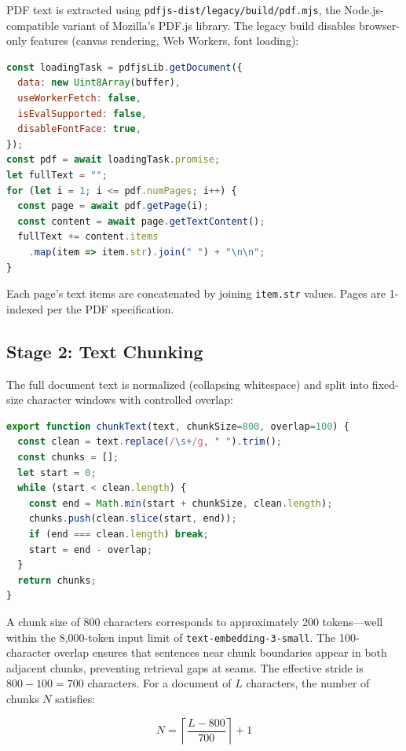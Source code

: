 \documentclass[conference]{IEEEtran}
\begin{document}
PDF text is extracted using \texttt{pdfjs-dist/legacy/build/pdf.mjs}, the Node.js-compatible variant of Mozilla's PDF.js library. The legacy build disables browser-only features (canvas rendering, Web Workers, font loading):

\begin{lstlisting}[language=JavaScript, caption={PDF text extraction (src/lib/rag.ts)}]
const loadingTask = pdfjsLib.getDocument({
  data: new Uint8Array(buffer),
  useWorkerFetch: false,
  isEvalSupported: false,
  disableFontFace: true,
});
const pdf = await loadingTask.promise;
let fullText = "";
for (let i = 1; i <= pdf.numPages; i++) {
  const page = await pdf.getPage(i);
  const content = await page.getTextContent();
  fullText += content.items
    .map(item => item.str).join(" ") + "\n\n";
}
\end{lstlisting}

Each page's text items are concatenated by joining \texttt{item.str} values. Pages are 1-indexed per the PDF specification.

\subsection{Stage 2: Text Chunking}

The full document text is normalized (collapsing whitespace) and split into fixed-size character windows with controlled overlap:

\begin{lstlisting}[language=JavaScript, caption={Fixed-size chunking with overlap}]
export function chunkText(text, chunkSize=800, overlap=100) {
  const clean = text.replace(/\s+/g, " ").trim();
  const chunks = [];
  let start = 0;
  while (start < clean.length) {
    const end = Math.min(start + chunkSize, clean.length);
    chunks.push(clean.slice(start, end));
    if (end === clean.length) break;
    start = end - overlap;
  }
  return chunks;
}
\end{lstlisting}

A chunk size of 800 characters corresponds to approximately 200 tokens---well within the 8,000-token input limit of \texttt{text-embedding-3-small}. The 100-character overlap ensures that sentences near chunk boundaries appear in both adjacent chunks, preventing retrieval gaps at seams. The effective stride is $800 - 100 = 700$ characters. For a document of $L$ characters, the number of chunks $N$ satisfies:

\begin{equation}
  N = \left\lceil \frac{L - 800}{700} \right\rceil + 1
  \label{eq:nchunks}
\end{equation}
\end{document}
